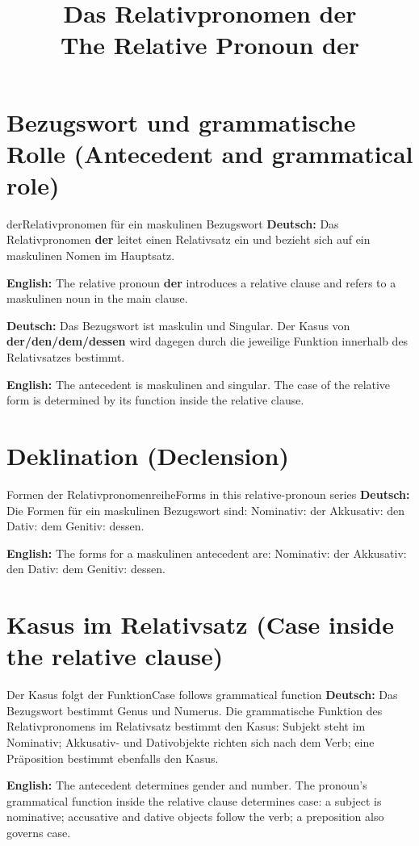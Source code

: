\documentclass[a4paper,11pt]{article}
\title{Das Relativpronomen \glqq der\grqq{}\\\large The Relative Pronoun \glqq der\grqq{}}
\date{}
\newcommand{\GermanText}[1]{\textbf{Deutsch: }#1\par}
\newcommand{\EnglishText}[1]{{\small\color{SoftGray}\textbf{English: }#1\par}}
\begin{document}
\maketitle
\tableofcontents
\newpage

\section{Bezugswort und grammatische Rolle (Antecedent and grammatical role)}
\begin{grammarentry}{der}{Relativpronomen für ein maskulinen Bezugswort}
\GermanText{Das Relativpronomen \textbf{der} leitet einen Relativsatz ein und bezieht sich auf ein maskulinen Nomen im Hauptsatz.}
\EnglishText{The relative pronoun \textbf{der} introduces a relative clause and refers to a maskulinen noun in the main clause.}
\GermanText{Das Bezugswort ist maskulin und Singular. Der Kasus von \textbf{der/den/dem/dessen} wird dagegen durch die jeweilige Funktion innerhalb des Relativsatzes bestimmt.}
\EnglishText{The antecedent is maskulinen and singular. The case of the relative form is determined by its function inside the relative clause.}
\end{grammarentry}

\section{Deklination (Declension)}
\begin{grammarentry}{Formen der Relativpronomenreihe}{Forms in this relative-pronoun series}
\GermanText{Die Formen für ein maskulinen Bezugswort sind: Nominativ: der \quad Akkusativ: den \quad Dativ: dem \quad Genitiv: dessen.}
\EnglishText{The forms for a maskulinen antecedent are: Nominativ: der \quad Akkusativ: den \quad Dativ: dem \quad Genitiv: dessen.}
\end{grammarentry}

\section{Kasus im Relativsatz (Case inside the relative clause)}
\begin{grammarentry}{Der Kasus folgt der Funktion}{Case follows grammatical function}
\GermanText{Das Bezugswort bestimmt Genus und Numerus. Die grammatische Funktion des Relativpronomens im Relativsatz bestimmt den Kasus: Subjekt steht im Nominativ; Akkusativ- und Dativobjekte richten sich nach dem Verb; eine Präposition bestimmt ebenfalls den Kasus.}
\EnglishText{The antecedent determines gender and number. The pronoun's grammatical function inside the relative clause determines case: a subject is nominative; accusative and dative objects follow the verb; a preposition also governs case.}
\end{grammarentry}
\end{document}
